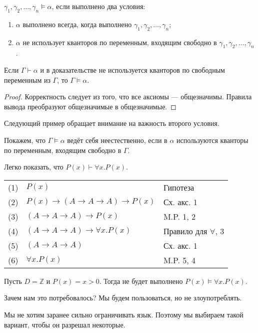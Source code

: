 \begin{definition}[Следование]
    $\gamma_1,\gamma_2,\dots,\gamma_n\models\alpha$, если выполнено два условия:
\begin{enumerate}
\item $\alpha$ выполнено всегда, когда выполнено $\gamma_1,\gamma_2,\dots,\gamma_n$;
\item $\alpha$ не использует кванторов по переменным, входящим свободно в $\gamma_1,\gamma_2,\dots,\gamma_n$.
\end{enumerate}
\end{definition}

\begin{theorem}
    Если $\Gamma\vdash\alpha$ и в доказательстве не используется кванторов по свободным
переменным из $\Gamma$, то $\Gamma\models\alpha$.
\end{theorem}

\begin{proof}
    Корректность следует из того, что все аксиомы — общезначимы. Правила вывода преобразуют общезначимые в общезначимые.
\end{proof}

Следующий пример обращает внимание на важность второго условия.
\begin{example}
    Покажем, что $\Gamma\models\alpha$ ведёт себя неестественно, если
в $\alpha$ используются кванторы по переменным, входящим свободно в $\Gamma$.

Легко показать, что $P(x)\vdash \forall x.P(x)$.

\begin{tabular}{lll}
(1) & $P(x)$ & Гипотеза \\
(2) & $P(x)\rightarrow (A\rightarrow A \rightarrow A) \rightarrow P(x)$ & Сх. акс. 1\\
(3) & $(A\rightarrow A \rightarrow A) \rightarrow P(x)$ & M.P. 1, 2\\
(4) & $(A\rightarrow A \rightarrow A) \rightarrow \forall x.P(x)$ & Правило для $\forall$, 3\\
(5) & $(A\rightarrow A \rightarrow A)$ & Сх. акс. 1\\
(6) & $\forall x.P(x)$ & M.P. 5, 4
\end{tabular}

Пусть $D = \mathbb{Z}$ и $P(x) = x > 0$. Тогда не будет выполнено $P(x)\models \forall x.P(x)$.
\end{example}

Зачем нам это потребовалось?  Мы будем пользоваться, но не злоупотреблять.

Мы не хотим заранее сильно ограничивать язык. Поэтому мы выбираем такой вариант, чтобы он разрешал некоторые.

